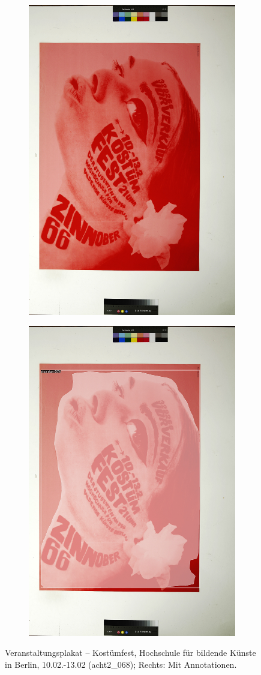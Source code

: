 \documentclass[a4paper,12pt,ngerman]{article}
\begin{document}
\newpage
\begin{landscape}
\begin{figure}[ht]
	\begin{subfigure}[b]{0.5\linewidth}
	\centering
	\includegraphics[height=\linewidth]{Abbildung_27_(acht2_068)}
	\end{subfigure}
	\begin{subfigure}[b]{0.5\linewidth}
	\centering
	\includegraphics[height=\linewidth]{Abbildung_27_(acht2_068)_with_detections}
	\end{subfigure}
	\caption{Veranstaltungsplakat – Kostümfest, Hochschule für bildende Künste in Berlin, 10.02.-13.02 (acht2\_068); Rechts: Mit Annotationen.}
\end{figure}
\end{landscape}
\end{document}
